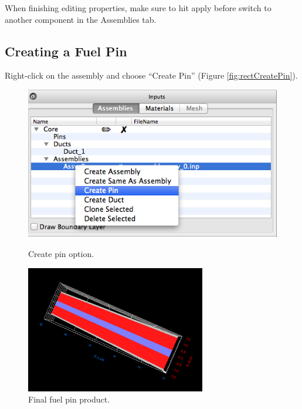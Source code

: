 \begin{commonerrors}
	When finishing editing properties, make sure to hit 
	apply before switch to another component in the Assemblies tab.
\end{commonerrors}


\subsection{Creating a Fuel Pin}

Right-click on the assembly and choose ``Create Pin'' (Figure \ref{fig:rectCreatePin}).

\begin{figure}
\centering
\begin{minipage}{.4\textwidth}
       \begin{center}
	\includegraphics[width=0.70\linewidth]{Images/rect-create-pin-option.png}
	\caption{Create pin option.}
	\label{fig:rectCreatePin}
     \end{center}
\vspace{15pt}
     \begin{center}
	 \includegraphics[width=0.70\textwidth]{Images/rect-pin.png}
	 \caption{Final fuel pin product.}
  	\label{fig:Rect6}
      \end{center}
\end{minipage} \hspace{.5cm}%

\end{figure}
